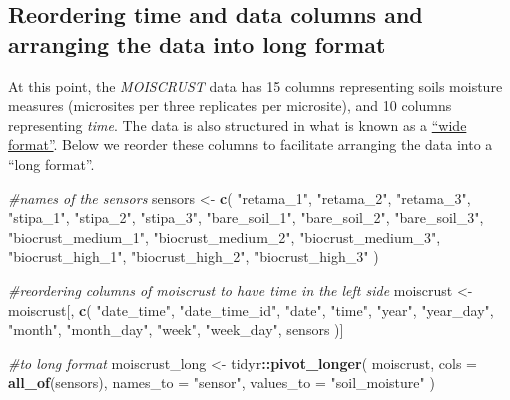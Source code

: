 \documentclass[]{article}
\newenvironment{Shaded}{\begin{snugshade}}{\end{snugshade}}
\newcommand{\CommentTok}[1]{\textcolor[rgb]{0.56,0.35,0.01}{\textit{#1}}}
\newcommand{\DataTypeTok}[1]{\textcolor[rgb]{0.13,0.29,0.53}{#1}}
\newcommand{\KeywordTok}[1]{\textcolor[rgb]{0.13,0.29,0.53}{\textbf{#1}}}
\newcommand{\NormalTok}[1]{#1}
\newcommand{\OperatorTok}[1]{\textcolor[rgb]{0.81,0.36,0.00}{\textbf{#1}}}
\newcommand{\StringTok}[1]{\textcolor[rgb]{0.31,0.60,0.02}{#1}}
\begin{document}
\hypertarget{reordering-time-and-data-columns-and-arranging-the-data-into-long-format}{%
\subsection{Reordering time and data columns and arranging the data into
long
format}\label{reordering-time-and-data-columns-and-arranging-the-data-into-long-format}}

At this point, the \emph{MOISCRUST} data has 15 columns representing
soils moisture measures (microsites per three replicates per microsite),
and 10 columns representing \emph{time}. The data is also structured in
what is known as a
\href{https://sejdemyr.github.io/r-tutorials/basics/wide-and-long/}{``wide
format''}. Below we reorder these columns to facilitate arranging the
data into a ``long format''.

\begin{Shaded}
\begin{Highlighting}[]
\CommentTok{#names of the sensors}
\NormalTok{sensors <-}\StringTok{ }\KeywordTok{c}\NormalTok{(}
  \StringTok{"retama_1"}\NormalTok{,}
  \StringTok{"retama_2"}\NormalTok{,}
  \StringTok{"retama_3"}\NormalTok{,}
  \StringTok{"stipa_1"}\NormalTok{,}
  \StringTok{"stipa_2"}\NormalTok{,}
  \StringTok{"stipa_3"}\NormalTok{,}
  \StringTok{"bare_soil_1"}\NormalTok{,}
  \StringTok{"bare_soil_2"}\NormalTok{,}
  \StringTok{"bare_soil_3"}\NormalTok{,}
  \StringTok{"biocrust_medium_1"}\NormalTok{,}
  \StringTok{"biocrust_medium_2"}\NormalTok{,}
  \StringTok{"biocrust_medium_3"}\NormalTok{,}
  \StringTok{"biocrust_high_1"}\NormalTok{,}
  \StringTok{"biocrust_high_2"}\NormalTok{,}
  \StringTok{"biocrust_high_3"}
\NormalTok{)}

\CommentTok{#reordering columns of moiscrust to have time in the left side}
\NormalTok{moiscrust <-}\StringTok{ }\NormalTok{moiscrust[, }\KeywordTok{c}\NormalTok{(}
  \StringTok{"date_time"}\NormalTok{,}
  \StringTok{"date_time_id"}\NormalTok{,}
  \StringTok{"date"}\NormalTok{,}
  \StringTok{"time"}\NormalTok{,}
  \StringTok{"year"}\NormalTok{,}
  \StringTok{"year_day"}\NormalTok{,}
  \StringTok{"month"}\NormalTok{,}
  \StringTok{"month_day"}\NormalTok{,}
  \StringTok{"week"}\NormalTok{,}
  \StringTok{"week_day"}\NormalTok{,}
\NormalTok{  sensors}
\NormalTok{)]}

\CommentTok{#to long format}
\NormalTok{moiscrust_long <-}\StringTok{ }\NormalTok{tidyr}\OperatorTok{::}\KeywordTok{pivot_longer}\NormalTok{(}
\NormalTok{  moiscrust,}
  \DataTypeTok{cols =} \KeywordTok{all_of}\NormalTok{(sensors),}
  \DataTypeTok{names_to =} \StringTok{"sensor"}\NormalTok{,}
  \DataTypeTok{values_to =} \StringTok{"soil_moisture"}
\NormalTok{)}
\end{Highlighting}
\end{Shaded}
\end{document}
